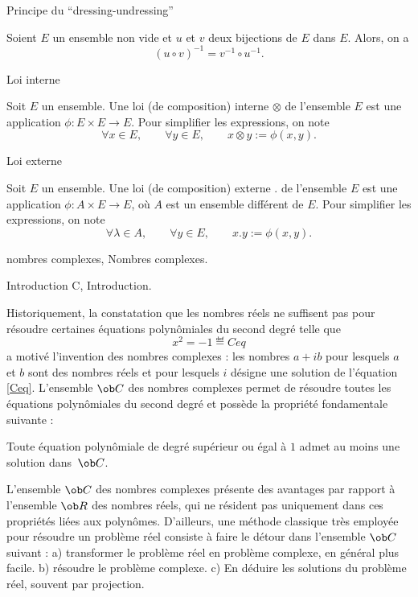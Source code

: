 \Concept Principe du ``dressing-undressing''

Soient $E$ un ensemble non vide et $u$ et $v$ deux bijections de $E$ dans $E$. Alors, on a 
$$
(u\circ v)^{-1}=v^{-1}\circ u^{-1}.
$$


\Concept Loi interne

Soit $E$ un ensemble. Une loi (de composition) interne $\otimes$ de l'ensemble $E$ est une application $\phi:E\times E\to E$. 
Pour simplifier les expressions, on note 
$$
\forall x\in E, \qquad\forall y\in E, \qquad x\otimes y:=\phi(x,y).
$$


\Concept Loi externe

Soit $E$ un ensemble. Une loi (de composition) externe $.$ de l'ensemble $E$ est une application $\phi:A\times E\to E$, o\`u $A$ est un ensemble diff\'erent de $E$. 
Pour simplifier les expressions, on note 
$$
\forall \lambda\in A, \qquad\forall y\in E, \qquad x.y:=\phi(x,y).
$$






\Chapter nombres complexes, Nombres complexes.

\Section Introduction C, Introduction. 

Historiquement, la constatation que les nombres r\'eels ne suffisent pas pour r\'esoudre certaines \'equations polyn\^omiales 
du second degr\'e telle que
$$
x^2=-1
\eqdef{Ceq}
$$ 
a motiv\'e l'invention des nombres complexes : les nombres $a+ib$ pour lesquels $a$ et $b$ sont des nombres r\'eels 
et pour lesquels $i$ d\'esigne une solution de l'\'equation \eqref{Ceq}. 
\bigskip
L'ensemble $\ob C$ des nombres complexes permet de r\'esoudre toutes les \'equations po\-ly\-n\^o\-mia\-les 
du second degr\'e et poss\`ede la propri\'et\'e fondamentale suivante : 

\Theoreme [Index=Theoreme@Th\'eor\`eme!de d'Alembert;Title=Th\'eor\`eme de d'Alembert-Gauss] 
Toute \'equation polyn\^omiale de degr\'e sup\'erieur ou \'egal \`a $1$ admet au moins une solution dans~$\ob C$. 

L'ensemble $\ob C$ des nombres complexes pr\'esente des avantages par rapport \`a l'ensemble $\ob R$ des nombres r\'eels, 
qui ne r\'esident pas uniquement dans ces propri\'et\'es li\'ees aux polyn\^omes. D'ailleurs, une m\'ethode classique tr\`es employ\'ee pour r\'esoudre un probl\`eme r\'eel consiste \`a faire le d\'etour dans l'ensemble $\ob C$ suivant : \medskip
 \noindent
a) transformer le probl\`eme r\'eel en probl\`eme complexe, en g\'en\'eral plus facile. 
\smallskip\noindent
b) r\'esoudre le probl\`eme complexe. 
\smallskip\noindent
c) En d\'eduire les solutions du probl\`eme r\'eel, souvent par projection. 
\bigskip

